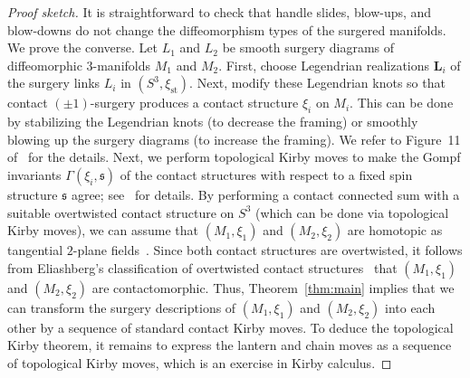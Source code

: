 \documentclass{amsart}
\numberwithin{equation}{section}
\numberwithin{figure}{section}
\theoremstyle{definition}
\theoremstyle{remark}
\let\olddxi\xi %
\renewcommand{\xi}{\olddxi}
\newcommand{\xist}{\olddxi_{\mathrm{st}}}
\let\oldgamma\Gamma %
\renewcommand{\Gamma}{\oldgamma}
\begin{document}
\begin{proof}[Proof sketch]
    It is straightforward to check that handle slides, blow-ups, and blow-downs do not change the diffeomorphism types of the surgered manifolds. We prove the converse. Let $L_1$ and $L_2$ be smooth surgery diagrams of diffeomorphic $3$-manifolds $M_1$ and $M_2$. First, choose Legendrian realizations $\boldsymbol{L}_i$ of the surgery links $L_i$ in $(S^3,\xist)$. Next, modify these Legendrian knots so that contact $(\pm1)$-surgery produces a contact structure $\xi_i$ on $M_i$. This can be done by stabilizing the Legendrian knots (to decrease the framing) or smoothly blowing up the surgery diagrams (to increase the framing). We refer to Figure~11 of~\cite{Ding_Geiges_Stipsicz} for the details. Next, we perform topological Kirby moves to make the Gompf invariants $\Gamma(\xi_i,\mathfrak{s})$ of the contact structures with respect to a fixed spin structure $\mathfrak{s}$ agree; see~\cite{Etnyre_Kegel_Onaran} for details. By performing a contact connected sum with a suitable overtwisted contact structure on $S^3$ (which can be done via topological Kirby moves), we can assume that $(M_1,\xi_1)$ and $(M_2,\xi_2)$ are homotopic as tangential $2$-plane fields~\cite{Gompf,Ding_Geiges_Stipsicz,Etnyre_Kegel_Onaran}. Since both contact structures are overtwisted, it follows from Eliashberg's classification of overtwisted contact structures~\cite{Eliashberg_OT} that $(M_1,\xi_1)$ and $(M_2,\xi_2)$ are contactomorphic. Thus, Theorem~\ref{thm:main} implies that we can transform the surgery descriptions of $(M_1,\xi_1)$ and $(M_2,\xi_2)$ into each other by a sequence of standard contact Kirby moves. To deduce the topological Kirby theorem, it remains to express the lantern and chain moves as a sequence of topological Kirby moves, which is an exercise in Kirby calculus.
\end{proof}


\printbibliography
\end{document}
